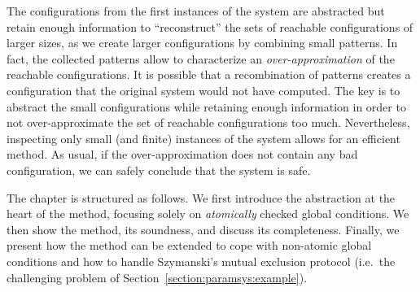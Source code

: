 %
The configurations from the first instances of the system are
abstracted but retain enough information to ``reconstruct'' the sets
of reachable configurations of larger sizes, as we create larger
configurations by combining small patterns. In fact, the collected
patterns allow to characterize an \emph{over-approximation} of the
reachable configurations. It is possible that a recombination of
patterns creates a configuration that the original system would not
have computed.
%
The key is to abstract the small configurations while retaining enough
information in order to not over-approximate the set of reachable
configurations too much.
%
Nevertheless, inspecting only small (and finite) instances of the
system allows for an efficient method.
%
As usual, if the over-approximation does not contain any bad
configuration, we can safely conclude that the system is safe.

The chapter is structured as follows. 
%
We first introduce the abstraction at the heart of the method,
focusing solely on \emph{atomically} checked global conditions.
%
We then show the method, its soundness, and discuss its
completeness.
%
Finally, we %
present how the method can be extended to cope with non-atomic global
conditions and how to handle Szymanski's mutual exclusion protocol
(i.e.\ the challenging problem of
Section~\ref{section:paramsys:example}).

